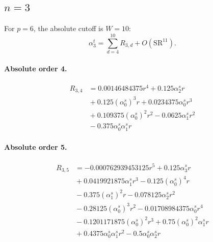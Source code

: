 \documentclass[10pt]{article}
\begin{document}
\subsection{$n=3$}
For $p=6$, the absolute cutoff is $W=10$:
\[\alpha_{3}^t=\sum_{d=4}^{10}R_{3,d}+O(\mathrm{SR}^{11}).\]
\paragraph{Absolute order 4.}
\begin{align*}
R_{3,4} &= 0.00146484375 r^{4} + 0.125 \alpha_{2}^s r \\
&{}  + 0.125 \left(\alpha_{0}^s\right)^{3} r + 0.0234375 \alpha_{0}^s r^{3} \\
&{}  + 0.109375 \left(\alpha_{0}^s\right)^{2} r^{2} - 0.0625 \alpha_{1}^s r^{2} \\
&{}  - 0.375 \alpha_{0}^s \alpha_{1}^s r
\end{align*}

\paragraph{Absolute order 5.}
\begin{align*}
R_{3,5} &=  - 0.000762939453125 r^{5} + 0.125 \alpha_{3}^s r \\
&{}  + 0.0419921875 \alpha_{1}^s r^{3} - 0.125 \left(\alpha_{0}^s\right)^{4} r \\
&{}  - 0.375 \left(\alpha_{1}^s\right)^{2} r - 0.078125 \alpha_{2}^s r^{2} \\
&{}  - 0.28125 \left(\alpha_{0}^s\right)^{3} r^{2} - 0.01708984375 \alpha_{0}^s r^{4} \\
&{}  - 0.1201171875 \left(\alpha_{0}^s\right)^{2} r^{3} + 0.75 \left(\alpha_{0}^s\right)^{2} \alpha_{1}^s r \\
&{}  + 0.4375 \alpha_{0}^s \alpha_{1}^s r^{2} - 0.5 \alpha_{0}^s \alpha_{2}^s r
\end{align*}
\end{document}
